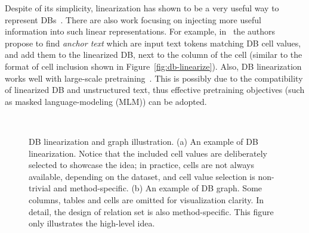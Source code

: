 \documentclass[11pt,dvipdfm]{article}
\begin{document}
Despite of its simplicity, linearization has shown to be a very useful way to represent DBs~\cite{picard,uskg}. There are also work focusing on injecting more useful information into such linear representations. For example, in~\cite{bridge} the authors propose to find \textit{anchor text} which are input text tokens matching DB cell values, and add them to the linearized DB, next to the column of the cell (similar to the format of cell inclusion shown in Figure~\ref{fig:db-linearize}). Also, DB linearization works well with large-scale pretraining~\cite{grappa,tabert}. This is possibly due to the compatibility of linearized DB and unstructured text, thus effective pretraining objectives (such as masked language-modeling (MLM)) can be adopted.




\begin{figure}[h]
\centering
{}~
\caption{DB linearization and graph illustration. (a) An example of DB linearization. Notice that the included cell values are deliberately selected to showcase the idea; in practice, cells are not always available, depending on the dataset, and cell value selection is non-trivial and method-specific. (b) An example of DB graph. Some columns, tables and cells are omitted for visualization clarity. In detail, the design of relation set is also method-specific. This figure only illustrates the high-level idea.}
\label{fig:db-line-and-graph}
\end{figure}
\end{document}
